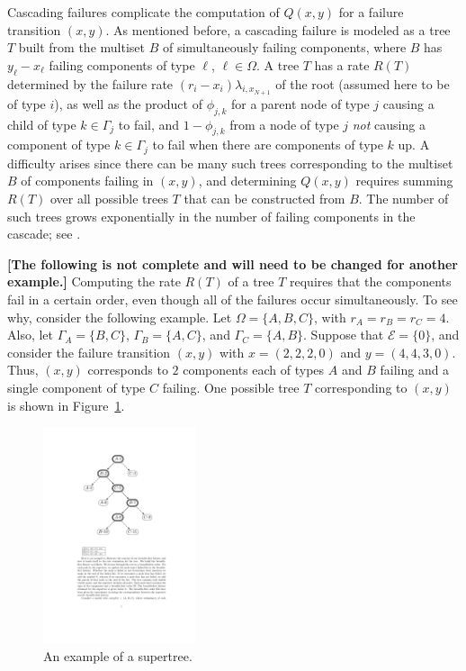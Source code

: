 \documentclass[12pt]{article}
\begin{document}
Cascading failures complicate the
computation of $Q(x, y)$
for a failure transition $(x, y)$.
As mentioned before, a cascading
failure is modeled as a tree $T$
built from the multiset $B$ of 
simultaneously failing
components,
where $B$ has
$y_\ell - x_\ell$ failing components
of type $\ell$, $\ell \in \Omega$.
A tree $T$ has a rate $R(T)$ determined
by the failure rate
$(r_i - x_i) \lambda_{i,x_{N + 1}}$
of the root (assumed here to be of type $i$),
as well as the product of $\phi_{j, k}$
for a parent node of type $j$ causing
a child of type $k \in \Gamma_j$ to fail,
and $1 - \phi_{j, k}$ from
a node of type $j$
\textit{not} causing
a component of type $k \in \Gamma_j$
to fail when there are
components of type $k$ up.
A difficulty arises since
there can be many such trees
corresponding to the multiset $B$
of components failing in $(x, y)$,
and determining $Q(x, y)$ requires
summing $R(T)$ over all possible
trees $T$ that can be constructed
from $B$.
The number of such trees
grows exponentially in the
number of failing components in the
cascade; see \cite{ING:2009}.


\textbf{[The following is not complete
and will need to be changed
for another example.]}
Computing the rate $R(T)$ of a tree $T$
requires that the components fail
in a certain order, even though all
of the failures occur simultaneously.
To see why, consider the following example.
Let $\Omega = \{ A, B, C \}$,
with $r_A = r_B = r_C = 4$.
Also, let
$\Gamma_A = \{ B, C \}$,
$\Gamma_B = \{ A, C \}$,
and
$\Gamma_C = \{ A, B \}$.
Suppose that $\mathcal{E} = \{ 0 \}$,
and consider the failure transition
$(x, y)$ with
$x = (2, 2, 2, 0)$
and
$y = (4, 4, 3, 0)$.
Thus, $(x, y)$ corresponds
to $2$ components each of
types $A$ and $B$ failing
and a single component of type
$C$ failing.
One possible tree $T$
corresponding to $(x, y)$
is shown in Figure~\ref{fig:tree}.

\begin{figure}
\begin{center}
\includegraphics[width=0.4\textwidth]{fig_tree}
\end{center}
\caption{An example of a supertree.}
\label{fig:tree}
\end{figure}
\end{document}
